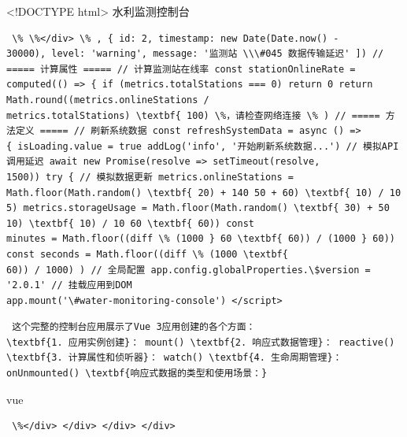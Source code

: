 \textless!DOCTYPE html\textgreater{} 水利监测控制台 \begin{verbatim} \% \%</div> \% , { id: 2, timestamp: new Date(Date.now() -
30000), level: 'warning', message: '监测站 \\\#045 数据传输延迟' ]) // ===== 计算属性 ===== // 计算监测站在线率 const stationOnlineRate =
computed(() => { if (metrics.totalStations === 0) return 0 return Math.round((metrics.onlineStations /
metrics.totalStations) \textbf{ 100) \%，请检查网络连接 \% ) // ===== 方法定义 ===== // 刷新系统数据 const refreshSystemData = async () =>
{ isLoading.value = true addLog('info', '开始刷新系统数据...') // 模拟API调用延迟 await new Promise(resolve => setTimeout(resolve,
1500)) try { // 模拟数据更新 metrics.onlineStations = Math.floor(Math.random() \textbf{ 20) + 140 50 + 60) \textbf{ 10) / 10
5) metrics.storageUsage = Math.floor(Math.random() \textbf{ 30) + 50 10) \textbf{ 10) / 10 60 \textbf{ 60)) const
minutes = Math.floor((diff \% (1000 } 60 \textbf{ 60)) / (1000 } 60)) const seconds = Math.floor((diff \% (1000 \textbf{
60)) / 1000) ) // 全局配置 app.config.globalProperties.\$version = '2.0.1' // 挂载应用到DOM
app.mount('\#water-monitoring-console') </script> \end{verbatim} \begin{lstlisting} 这个完整的控制台应用展示了Vue 3应用创建的各个方面：
\textbf{1. 应用实例创建}： mount() \textbf{2. 响应式数据管理}： reactive() \textbf{3. 计算属性和侦听器}： watch() \textbf{4. 生命周期管理}：
onUnmounted() \textbf{响应式数据的类型和使用场景：} \end{lstlisting} vue \begin{verbatim} \%</div> </div> </div> </div> \end{verbatim}
